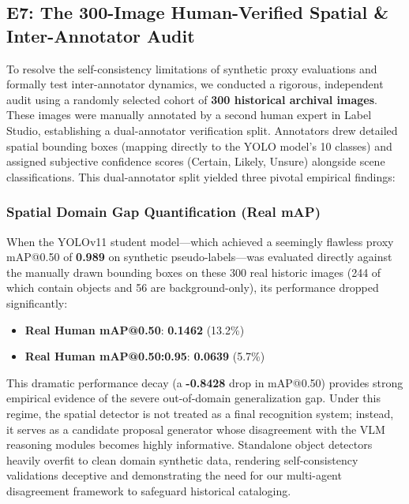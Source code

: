 \documentclass[12pt,onecolumn,a4paper]{IEEEtran}
\begin{document}
\subsection{E7: The 300-Image Human-Verified Spatial \& Inter-Annotator Audit}
\label{sec:human_spatial_audit_results}

To resolve the self-consistency limitations of synthetic proxy evaluations and formally test inter-annotator dynamics, we conducted a rigorous, independent audit using a randomly selected cohort of \textbf{300 historical archival images}. These images were manually annotated by a second human expert in Label Studio, establishing a dual-annotator verification split. Annotators drew detailed spatial bounding boxes (mapping directly to the YOLO model's 10 classes) and assigned subjective confidence scores (Certain, Likely, Unsure) alongside scene classifications. This dual-annotator split yielded three pivotal empirical findings:

\subsubsection{Spatial Domain Gap Quantification (Real mAP)}
When the YOLOv11 student model—which achieved a seemingly flawless proxy mAP@0.50 of \textbf{0.989} on synthetic pseudo-labels—was evaluated directly against the manually drawn bounding boxes on these 300 real historic images (244 of which contain objects and 56 are background-only), its performance dropped significantly:
\begin{itemize}
    \item \textbf{Real Human mAP@0.50}: \textbf{0.1462} (13.2\%)
    \item \textbf{Real Human mAP@0.50:0.95}: \textbf{0.0639} (5.7\%)
\end{itemize}
This dramatic performance decay (a \textbf{-0.8428} drop in mAP@0.50) provides strong empirical evidence of the severe out-of-domain generalization gap. Under this regime, the spatial detector is not treated as a final recognition system; instead, it serves as a candidate proposal generator whose disagreement with the VLM reasoning modules becomes highly informative. Standalone object detectors heavily overfit to clean domain synthetic data, rendering self-consistency validations deceptive and demonstrating the need for our multi-agent disagreement framework to safeguard historical cataloging.
\end{document}
